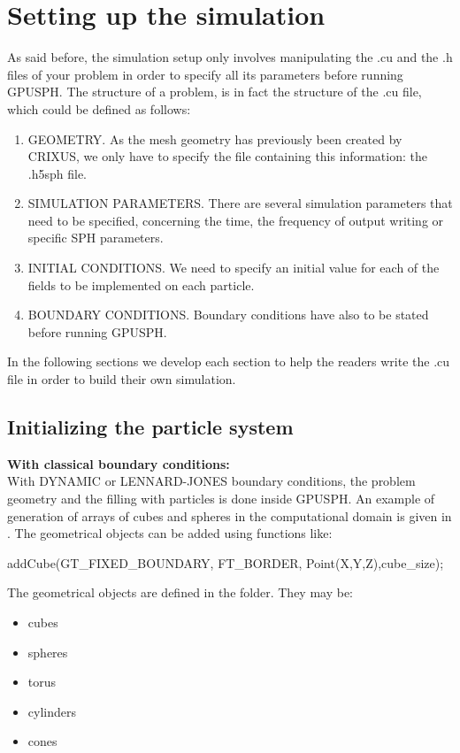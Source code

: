 \documentclass[12pt]{memoir}
\begin{document}
\section{Setting up the simulation}

As said before, the simulation setup only involves manipulating the .cu and the .h 
files of your problem in order to specify all its parameters before running GPUSPH. 
The structure of a problem, is in fact the structure of the .cu file, 
which could be defined as follows:
\begin{enumerate}
\item GEOMETRY. As the mesh geometry has previously been 
created by CRIXUS, we only have to specify the file 
containing this information: the .h5sph file.
\item SIMULATION PARAMETERS. There are several simulation 
parameters that need to be specified, concerning the time, 
the frequency of output writing or specific SPH parameters.
\item INITIAL CONDITIONS. We need to specify an initial 
value for each of the fields to be implemented on each particle.
\item BOUNDARY CONDITIONS. Boundary conditions 
have also to be stated before running GPUSPH.
\end{enumerate}
In the following sections we develop each section to help 
the readers write the .cu file in order to build their own simulation.


\subsection{Initializing the particle system}

\textbf{With classical boundary conditions:}\\

With DYNAMIC or LENNARD-JONES boundary conditions, the
problem geometry and the filling with particles is done
inside GPUSPH. An example of generation of arrays
of cubes and spheres in the computational domain is given in
. 
The geometrical objects can be added using functions like:
\begin{ccode}
addCube(GT_FIXED_BOUNDARY, FT_BORDER,
             Point(X,Y,Z),cube_size);
\end{ccode}
The geometrical objects are defined in the  folder.
They may be:
\begin{itemize}
\item cubes
\item spheres
\item torus
\item cylinders
\item cones
\end{itemize}
\end{document}
